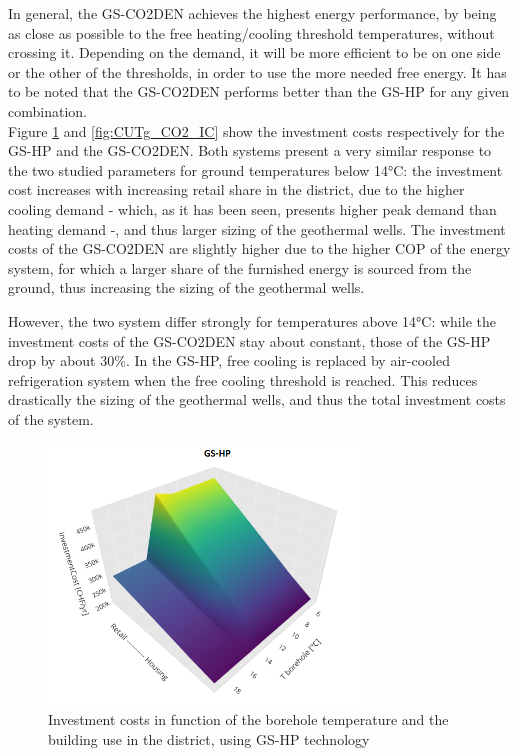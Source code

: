 \documentclass{article}
\begin{document}
In general, the GS-CO2DEN achieves the highest energy performance, by being as close as possible to the free heating/cooling threshold temperatures, without crossing it. Depending on the demand, it will be more efficient to be on one side or the other of the thresholds, in order to use the more needed free energy. It has to be noted that the GS-CO2DEN performs better than the GS-HP for any given combination. \\

Figure \ref{fig:CUTg_IC} and \ref{fig:CUTg_CO2_IC} show the investment costs respectively for the GS-HP and the GS-CO2DEN. Both systems present a very similar response to the two studied parameters for ground temperatures below 14\si{\celsius}: the investment cost increases with increasing retail share in the district, due to the higher cooling demand - which, as it has been seen, presents higher peak demand than heating demand -, and thus larger sizing of the geothermal wells. The investment costs of the GS-CO2DEN are slightly higher due to the higher COP of the energy system, for which a larger share of the furnished energy is sourced from the ground, thus increasing the sizing of the geothermal wells. 

However, the two system differ strongly for temperatures above 14\si{\celsius}: while the investment costs of the GS-CO2DEN stay about constant, those of the GS-HP drop by about 30\%. In the GS-HP, free cooling is replaced by air-cooled refrigeration system when the free cooling threshold is reached. This reduces drastically the sizing of the geothermal wells, and thus the total investment costs of the system. \\

\begin{figure}[htp]
	\centering
	\includegraphics[width=0.75\textwidth]{CUTg_SA_IC.png}
	\caption{Investment costs in function of the borehole temperature and the building use in the district, using GS-HP technology}
	\label{fig:CUTg_IC}
\end{figure}
\end{document}
